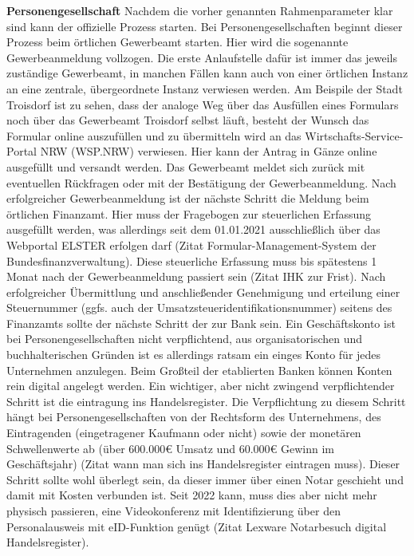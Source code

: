 \textbf{Personengesellschaft}
Nachdem die vorher genannten Rahmenparameter klar sind kann der offizielle Prozess starten. Bei Personengesellschaften beginnt dieser Prozess beim örtlichen Gewerbeamt starten. Hier wird die sogenannte Gewerbeanmeldung vollzogen. Die erste Anlaufstelle dafür ist immer das jeweils zuständige Gewerbeamt, in manchen Fällen kann auch von einer örtlichen Instanz an eine zentrale, übergeordnete Instanz verwiesen werden. Am Beispile der Stadt Troisdorf ist zu sehen, dass der analoge Weg über das Ausfüllen eines Formulars noch über das Gewerbeamt Troisdorf selbst läuft, besteht der Wunsch das Formular online auszufüllen und zu übermitteln wird an das Wirtschafts-Service-Portal NRW (WSP.NRW) verwiesen. Hier kann der Antrag in Gänze online ausgefüllt und versandt werden. Das Gewerbeamt meldet sich zurück mit eventuellen Rückfragen oder mit der Bestätigung der Gewerbeanmeldung.
Nach erfolgreicher Gewerbeanmeldung ist der nächste Schritt die Meldung beim örtlichen Finanzamt. Hier muss der Fragebogen zur steuerlichen Erfassung ausgefüllt werden, was allerdings seit dem 01.01.2021 ausschließlich über das Webportal ELSTER erfolgen darf (Zitat Formular-Management-System der Bundesfinanzverwaltung). Diese steuerliche Erfassung muss bis spätestens 1 Monat nach der Gewerbeanmeldung passiert sein (Zitat IHK zur Frist). Nach erfolgreicher Übermittlung und anschließender Genehmigung und erteilung einer Steuernummer (ggfs. auch der Umsatzsteueridentifikationsnummer) seitens des Finanzamts sollte der nächste Schritt der zur Bank sein. Ein Geschäftskonto ist bei Personengesellschaften nicht verpflichtend, aus organisatorischen und buchhalterischen Gründen ist es allerdings ratsam ein einges Konto für jedes Unternehmen anzulegen. Beim Großteil der etablierten Banken können Konten rein digital angelegt werden. 
Ein wichtiger, aber nicht zwingend verpflichtender Schritt ist die eintragung ins Handelsregister. Die Verpflichtung zu diesem Schritt hängt bei Personengesellschaften von der Rechtsform des Unternehmens, des Eintragenden (eingetragener Kaufmann oder nicht) sowie der monetären Schwellenwerte ab (über 600.000€ Umsatz und 60.000€ Gewinn im Geschäftsjahr) (Zitat wann man sich ins Handelsregister eintragen muss). Dieser Schritt sollte wohl überlegt sein, da dieser immer über einen Notar geschieht und damit mit Kosten verbunden ist. Seit 2022 kann, muss dies aber nicht mehr physisch passieren, eine Videokonferenz mit Identifizierung über den Personalausweis mit eID-Funktion genügt (Zitat Lexware Notarbesuch digital Handelsregister). 

